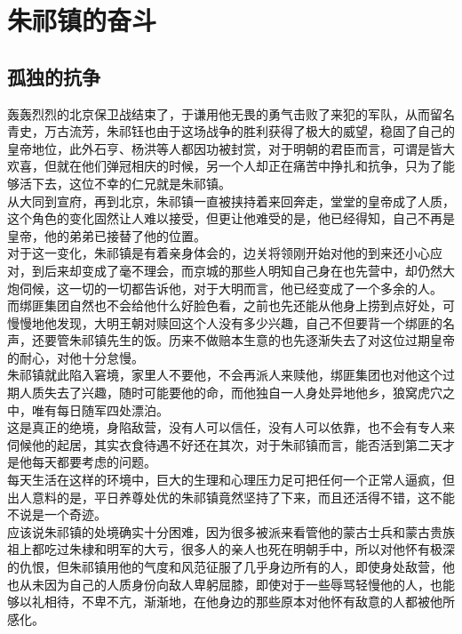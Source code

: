 \section{朱祁镇的奋斗}
\ifnum{}
	\begin{multicols}{\theparacolNo}
\fi
\subsection{孤独的抗争}
轰轰烈烈的北京保卫战结束了，于谦用他无畏的勇气击败了来犯的军队，从而留名青史，万古流芳，朱祁钰也由于这场战争的胜利获得了极大的威望，稳固了自己的皇帝地位，此外石亨、杨洪等人都因功被封赏，对于明朝的君臣而言，可谓是皆大欢喜，但就在他们弹冠相庆的时候，另一个人却正在痛苦中挣扎和抗争，只为了能够活下去，这位不幸的仁兄就是朱祁镇。\\

从大同到宣府，再到北京，朱祁镇一直被挟持着来回奔走，堂堂的皇帝成了人质，这个角色的变化固然让人难以接受，但更让他难受的是，他已经得知，自己不再是皇帝，他的弟弟已接替了他的位置。\\

对于这一变化，朱祁镇是有着亲身体会的，边关将领刚开始对他的到来还小心应对，到后来却变成了毫不理会，而京城的那些人明知自己身在也先营中，却仍然大炮伺候，这一切的一切都告诉他，对于大明而言，他已经变成了一个多余的人。\\

而绑匪集团自然也不会给他什么好脸色看，之前也先还能从他身上捞到点好处，可慢慢地他发现，大明王朝对赎回这个人没有多少兴趣，自己不但要背一个绑匪的名声，还要管朱祁镇先生的饭。历来不做赔本生意的也先逐渐失去了对这位过期皇帝的耐心，对他十分怠慢。\\

朱祁镇就此陷入窘境，家里人不要他，不会再派人来赎他，绑匪集团也对他这个过期人质失去了兴趣，随时可能要他的命，而他独自一人身处异地他乡，狼窝虎穴之中，唯有每日随军四处漂泊。\\

这是真正的绝境，身陷敌营，没有人可以信任，没有人可以依靠，也不会有专人来伺候他的起居，其实衣食待遇不好还在其次，对于朱祁镇而言，能否活到第二天才是他每天都要考虑的问题。\\

每天生活在这样的环境中，巨大的生理和心理压力足可把任何一个正常人逼疯，但出人意料的是，平日养尊处优的朱祁镇竟然坚持了下来，而且还活得不错，这不能不说是一个奇迹。\\

应该说朱祁镇的处境确实十分困难，因为很多被派来看管他的蒙古士兵和蒙古贵族祖上都吃过朱棣和明军的大亏，很多人的亲人也死在明朝手中，所以对他怀有极深的仇恨，但朱祁镇用他的气度和风范征服了几乎身边所有的人，即使身处敌营，他也从未因为自己的人质身份向敌人卑躬屈膝，即使对于一些辱骂轻慢他的人，也能够以礼相待，不卑不亢，渐渐地，在他身边的那些原本对他怀有敌意的人都被他所感化。\\


\end{multicols}
